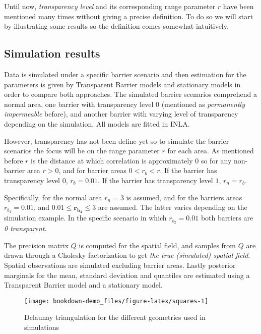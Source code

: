 \documentclass[
]{book}
\begin{document}
Until now, \emph{transparency level} and its corresponding range parameter \(r\) have been mentioned many times without giving a precise definition. To do so we will start by illustrating some results so the definition comes somewhat intuitively.

\hypertarget{simulation-results}{%
\subsection{Simulation results}\label{simulation-results}}

Data is simulated under a specific barrier scenario and then estimation for the parameters is given by Transparent Barrier models and stationary models in order to compare both approaches. The simulated barrier scenarios comprehend a normal area, one barrier with transparency level \(0\) (mentioned as \emph{permanently impermeable} before), and another barrier with varying level of transparency depending on the simulation. All models are fitted in INLA.

However, transparency has not been define yet so to simulate the barrier scenarios the focus will be on the range parameter \(r\) for each area. As mentioned before \(r\) is the distance at which correlation is approximately \(0\) so for any non-barrier area \(r>0\), and for barrier areas \(0<r_b<r\). If the barrier has transparency level \(0\), \(r_b=0.01\). If the barrier has transparency level \(1\), \(r_n=r_b\).

Specifically, for the normal area \(r_n=3\) is assumed, and for the barriers areas \(r_{b_1}=0.01\), and \(0.01\leq\mathbf{r_{b_2}}\leq3\) are assumed. The latter varies depending on the simulation example. In the specific scenario in which \(r_{b_2}=0.01\) both barriers are \emph{0 transparent}.

The precision matrix \(Q\) is computed for the spatial field, and samples from \(Q\) are drawn through a Cholesky factorization \citep{rue_gaussian_2005} to get \emph{the true (simulated) spatial field}. Spatial observations are simulated excluding barrier areas. Lastly posterior marginals for the mean, standard deviation and quantiles are estimated using a Transparent Barrier model and a stationary model.

\begin{figure}
\texttt{[image: bookdown-demo\_files/figure-latex/squares-1]} \caption{Delaunay triangulation for the different geometries used in simulations}\label{fig:squares}
\end{figure}
\end{document}
